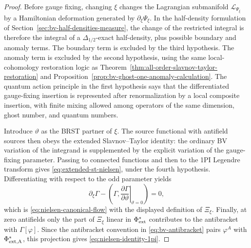 \begin{proof}
Before gauge fixing, changing \(\xi\) changes the Lagrangian submanifold
\(\mathcal L_{\Psi_\xi}\) by a Hamiltonian deformation generated by
\(\partial_\xi\Psi_\xi\).  In the half-density formulation of
Section~\ref{sec:bv-half-densities-measure}, the change of the restricted
integral is therefore the integral of a \(\Delta_{1/2}\)-exact half-density,
plus possible boundary and anomaly terms.  The boundary term is excluded by
the third hypothesis.  The anomaly term is excluded by the second hypothesis,
using the same local-cohomology restoration logic as
Theorem~\ref{thm:all-order-slavnov-taylor-restoration} and
Proposition~\ref{prop:bv-ghost-one-anomaly-calculation}.  The quantum action
principle in the first hypothesis says that the differentiated gauge-fixing
insertion is represented after renormalization by a local composite insertion,
with finite mixing allowed among operators of the same dimension, ghost
number, and quantum numbers.

Introduce \(\vartheta\) as the BRST partner of \(\xi\).  The source functional
with antifield sources then obeys the extended Slavnov--Taylor identity:
the ordinary BV variation of the integrand is supplemented by the explicit
variation of the gauge-fixing parameter.  Passing to connected functions and
then to the 1PI Legendre transform gives
\eqref{eq:extended-st-nielsen}, under the fourth hypothesis.  Differentiating
with respect to the odd parameter yields
\[
  \partial_\xi\Gamma
  -
  \left(\Gamma,
  \left.\frac{\partial\Gamma}{\partial\vartheta}\right|_{\vartheta=0}
  \right)
  =
  0,
\]
which is \eqref{eq:nielsen-canonical-flow} with the displayed definition of
\(\Xi_\xi\).  Finally, at zero antifields only the part of \(\Xi_\xi\) linear
in \(\Phi^*_{\rm ext}\) contributes to the antibracket with
\(\Gamma[\varphi]\).  Since the antibracket convention in
\eqref{eq:bv-antibracket} pairs \(\varphi^A\) with
\(\Phi^*_{\rm ext,A}\), this projection gives
\eqref{eq:nielsen-identity-1pi}.
\end{proof}

